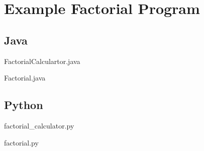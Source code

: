 \documentclass{article}
\begin{document}
\newpage

\section{Example Factorial Program}
\subsection{Java}
FactorialCalculartor.java

Factorial.java


\subsection{Python}
factorial\_calculator.py

factorial.py

\end{document}
